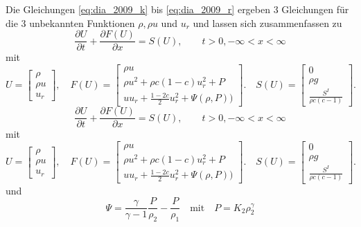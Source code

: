 Die Gleichungen \ref{eq:dia_2009_k} bis \ref{eq:dia_2009_r}
ergeben 3 Gleichungen für die 3 unbekannten Funktionen $\rho, \rho
u$ und $u_r$ und lassen sich zusammenfassen zu
\begin{equation}
\frac{\partial U}{\partial t} + \frac{\partial F(U)}{\partial x} =
S(U),\qquad t > 0, -\infty < x < \infty
\end{equation}
mit
\begin{equation}
U = \left[\begin{array}{c}\rho \\ \rho u \\ u_r\end{array}\right],
\quad 
F(U) = \left[\begin{array}{c}\rho u \\[2mm] 
\rho u^2 + \rho c (1-c) u_r^2 + P\\[2mm] 
uu_r + \frac{1-2c}{2} u_r^2 + \Psi(\rho,P))\end{array}\right]. 
\quad
S(U) = \left[\begin{array}{c}0 \\ \rho g \\ \frac{S^I}{\rho c
  (c-1)}\end{array}\right].
\end{equation}
\begin{equation}
\frac{\partial U}{\partial t} + \frac{\partial F(U)}{\partial x} =
S(U),\qquad t > 0, -\infty < x < \infty
\end{equation}
mit
\begin{equation}
U = \left[\begin{array}{c}\rho \\ \rho u \\ u_r\end{array}\right],
\quad 
F(U) = \left[\begin{array}{c}\rho u \\[2mm] 
\rho u^2 + \rho c (1-c) u_r^2 + P\\[2mm] 
uu_r + \frac{1-2c}{2} u_r^2 + \Psi(\rho,P))\end{array}\right]. 
\quad
S(U) = \left[\begin{array}{c}0 \\ \rho g \\ \frac{S^I}{\rho c
  (c-1)}\end{array}\right].
\end{equation}
und
\begin{equation}
\Psi = \frac{\gamma}{\gamma-1} \frac{P}{\rho_2} -
\frac{P}{\rho_1}\quad\mbox{mit}\quad P = K_2 \rho_2^\gamma
\end{equation}
